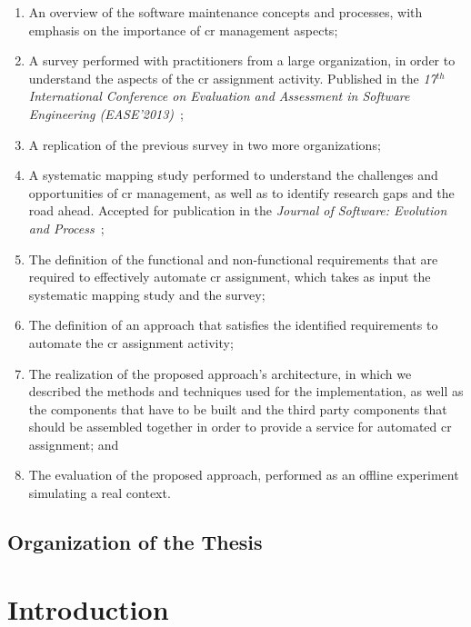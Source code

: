 {\begin{enumerate}
  \item An overview of the software maintenance concepts and processes, with
  emphasis on the importance of \ac{cr} management aspects; 
  \item A survey performed with practitioners from a large organization, in
  order to understand the aspects of the \ac{cr} assignment
  activity. Published in the \emph{17$^{th}$ International Conference on Evaluation
  and Assessment in Software Engineering (EASE'2013)}~;
  \item A replication of the previous survey in two more organizations;
  \item A systematic mapping study performed to understand the challenges and
  opportunities of \ac{cr} management, as well as to identify research gaps and
  the road ahead. Accepted for publication in the
  \emph{Journal of Software: Evolution and Process}~;
  \item The definition of the functional and non-functional requirements that
  are required to effectively automate \ac{cr} assignment, which takes as input
  the systematic mapping study and the survey;
  \item The definition of an approach that satisfies the
  identified requirements to automate the \ac{cr} assignment activity;
  \item The realization of the proposed approach's architecture, in which we
  described the methods and techniques used for the implementation, as well as the
  components that have to be built and the third party components that should be
  assembled together in order to provide a service for automated \ac{cr}
  assignment; and
  \item The evaluation of the proposed approach, performed as an offline
  experiment simulating a real context.
\end{enumerate}

\section{Organization of the Thesis}

\lipsum[5-10]
}

\chapter{Introduction}
\label{chp:intro}


